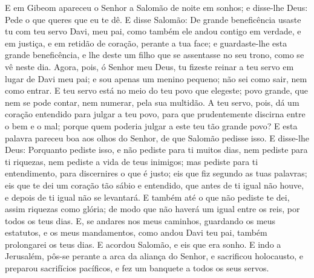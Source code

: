 E em Gibeom apareceu o Senhor a Salomão de noite em sonhos; e
disse-lhe Deus: Pede o que queres que eu te dê. E disse Salomão:
De grande beneficência usaste tu com teu servo Davi, meu pai, como
também ele andou contigo em verdade, e em justiça, e em retidão de
coração, perante a tua face; e guardaste-lhe esta grande
beneficência, e lhe deste um filho que se assentasse no seu trono,
como se vê neste dia. Agora, pois, ó Senhor meu Deus, tu fizeste
reinar a teu servo em lugar de Davi meu pai; e sou apenas um menino
pequeno; não sei como sair, nem como entrar. E teu servo está no
meio do teu povo que elegeste; povo grande, que nem se pode contar,
nem numerar, pela sua multidão. A teu servo, pois, dá um coração
entendido para julgar a teu povo, para que prudentemente discirna
entre o bem e o mal; porque quem poderia julgar a este teu tão
grande povo? E esta palavra pareceu boa aos olhos do Senhor,
de que Salomão pedisse isso. E disse-lhe Deus: Porquanto
pediste isso, e não pediste para ti muitos dias, nem pediste para ti
riquezas, nem pediste a vida de teus inimigos; mas pediste para ti
entendimento, para discernires o que é justo; eis que fiz
segundo as tuas palavras; eis que te dei um coração tão sábio e
entendido, que antes de ti igual não houve, e depois de ti igual não
se levantará. E também até o que não pediste te dei, assim
riquezas como glória; de modo que não haverá um igual entre os reis,
por todos os teus dias. E, se andares nos meus caminhos,
guardando os meus estatutos, e os meus mandamentos, como andou Davi
teu pai, também prolongarei os teus dias. E acordou Salomão,
e eis que era sonho. E indo a Jerusalém, pôs-se perante a arca da
aliança do Senhor, e sacrificou holocausto, e preparou sacrifícios
pacíficos, e fez um banquete a todos os seus servos.

